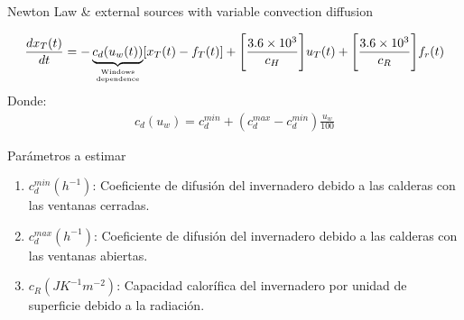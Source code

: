     \begin{model}{Newton Law \& external sources with variable convection diffusion}{}
    
    \begin{gather}
        \frac{dx_{T}(t)}{dt} =  
        -\underbrace{c_d(u_{w}(t))}_{\text{Windows}\atop\text{dependence}}[x_{T}(t) - f_{T}(t)] +
        \Bigg[ \frac{3.6 \times 10^{3}}{c_H} \Bigg] u_{T}(t)+ 
        \Bigg[ \frac{3.6 \times 10^{3}}{ c_R } \Bigg] f_r(t)
    \end{gather}
    Donde:
    \begin{gather}
        c_d(u_w) =  c_d^{min} + (c_d^{max} - c_d^{min})\frac{u_{w}}{100}
    \end{gather}
    
    Parámetros a estimar
    \begin{enumerate}
        \item $c_d^{min}( h^{-1})$: Coeficiente de difusión del invernadero debido a las calderas con las ventanas cerradas.
        \item $c_d^{max}( h^{-1})$: Coeficiente de difusión del invernadero debido a las calderas con las ventanas abiertas. 
        \item $c_R(JK^{-1}m^{-2})$: Capacidad calorífica del invernadero por unidad de superficie debido a la radiación.
    \end{enumerate}
    \end{model}
    


